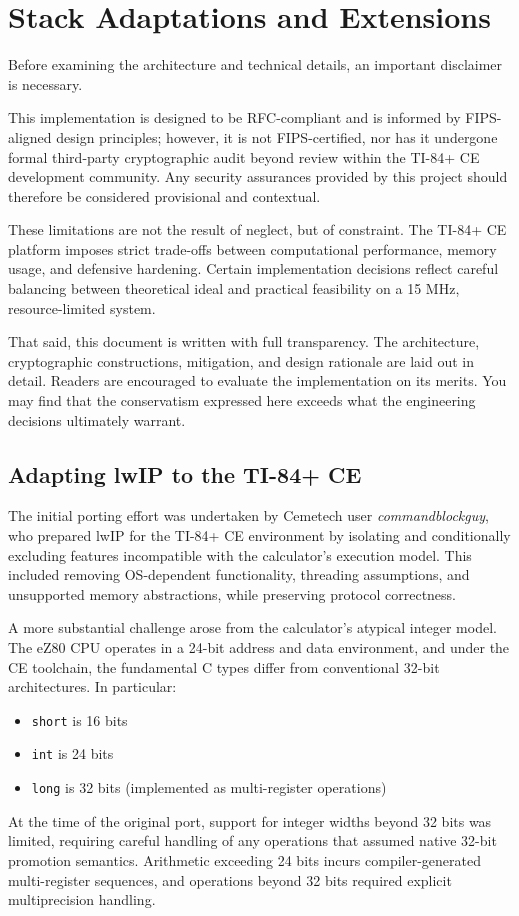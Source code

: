 \documentclass[titlepage]{report}
\begin{document}
	\newpage
	\section{Stack Adaptations and Extensions}
	\label{sec:implementation_overview}
	
		Before examining the architecture and technical details, an important disclaimer is necessary.
		
		This implementation is designed to be RFC-compliant and is informed by FIPS-aligned design principles; however, it is not FIPS-certified, nor has it undergone formal third-party cryptographic audit beyond review within the TI-84+ CE development community. Any security assurances provided by this project should therefore be considered provisional and contextual.
		
		These limitations are not the result of neglect, but of constraint. The TI-84+ CE platform imposes strict trade-offs between computational performance, memory usage, and defensive hardening. Certain implementation decisions reflect careful balancing between theoretical ideal and practical feasibility on a 15 MHz, resource-limited system.
		
		That said, this document is written with full transparency. The architecture, cryptographic constructions, mitigation, and design rationale are laid out in detail. Readers are encouraged to evaluate the implementation on its merits. You may find that the conservatism expressed here exceeds what the engineering decisions ultimately warrant.
		
		\subsection{Adapting lwIP to the TI-84+ CE}
		The initial porting effort was undertaken by Cemetech user \textit{commandblockguy}, who prepared lwIP for the TI-84+ CE environment by isolating and conditionally excluding features incompatible with the calculator’s execution model. This included removing OS-dependent functionality, threading assumptions, and unsupported memory abstractions, while preserving protocol correctness.
		
		A more substantial challenge arose from the calculator’s atypical integer model. The eZ80 CPU operates in a 24-bit address and data environment, and under the CE toolchain, the fundamental C types differ from conventional 32-bit architectures. In particular:
		\begin{itemize}
		\item \texttt{short} is 16 bits
		\item \texttt{int} is 24 bits
		\item \texttt{long} is 32 bits (implemented as multi-register operations)
		\end{itemize}
		At the time of the original port, support for integer widths beyond 32 bits was limited, requiring careful handling of any operations that assumed native 32-bit promotion semantics. Arithmetic exceeding 24 bits incurs compiler-generated multi-register sequences, and operations beyond 32 bits required explicit multiprecision handling.
		
\end{document}

